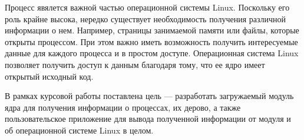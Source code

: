 \maketableofcontents

\intro

Процесс явялется важной частью операционной системы Linux. Поскольку его роль крайне высока, нередко существует необходимость получения различной информации о нем. Например, страницы занимаемой памяти или файлы, которые открыты процессом. При этом важно иметь возможность получить интересуемые данные для каждого процесса и в простом доступе. Операционная система Linux позволяет получить доступ к данным благодаря тому, что ее ядро имеет открытый исходный код.

В рамках курсовой работы поставлена цель --- разработать загружаемый модуль ядра для получения информации о процессах, их дерово, а также пользовательское приложение для вывода полученной информации от модуля и об операционной системе Linux в целом.
